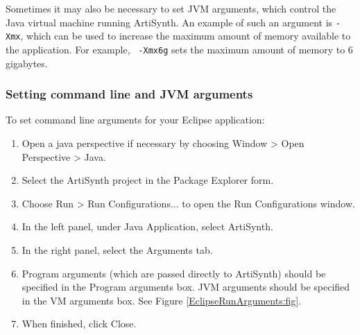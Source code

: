 Sometimes it may also be necessary to set JVM arguments, which control
the Java virtual machine running ArtiSynth.  An example of such an
argument is {\tt -Xmx}, which can be used to increase the maximum
amount of memory available to the application.  For example, {\tt
-Xmx6g} sets the maximum amount of memory to 6 gigabytes.

\subsubsection {Setting command line and JVM arguments}
\label{SettingCommandLineArguments}

To set command line arguments for your Eclipse application:

\begin{enumerate}

\item Open a java perspective if necessary by choosing
  {\sf Window > Open Perspective > Java}.

\item Select the ArtiSynth project in the {\sf Package Explorer} form.

\item Choose {\sf Run > Run Configurations...} to open the {\sf Run
  Configurations} window.

\item In the left panel, under {\sf Java Application}, select {\sf ArtiSynth}.

\item In the right panel, select the {\sf Arguments} tab.

\item Program arguments (which are passed directly to ArtiSynth)
should be specified in the {\sf Program arguments} box.  JVM arguments
should be specified in the {\sf VM arguments} box. See Figure
\ref{EclipseRunArguments:fig}.

\item When finished, click {\sf Close}.

\end{enumerate}

